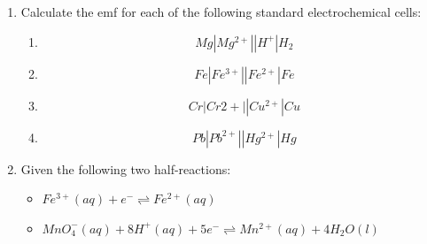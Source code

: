 {\begin{enumerate}
	\begin{enumerate}
	\item{Write down the standard conditions which apply to this electrochemical cell.}
	\item{Identify the metal M. Show calculations.}
	\item Use the standard electrode potentials to write down equations for the:
		\begin{enumerate}
		\item{cathode half-reaction}
		\item{anode half-reaction}
		\item{overall cell reaction}
		\end{enumerate}
	\item{What is the purpose of the salt bridge?}
	\item{Explain why a KCl solution would not be suitable for use in the salt bridge in this cell.}
	\end{enumerate}

(IEB Paper 2, 2004)

\item Calculate the emf for each of the following standard electrochemical cells:

	\begin{enumerate}

\item 
\begin{equation*}
Mg|Mg^{2+}||H^{+}|H_{2}
\end{equation*}

\item
\begin{equation*}
Fe|Fe^{3+}||Fe^{2+}|Fe
\end{equation*}


\item
\begin{equation*}
Cr|Cr{2+}||Cu^{2+}|Cu
\end{equation*}


\item
\begin{equation*}
Pb|Pb^{2+}||Hg^{2+}|Hg
\end{equation*}

\end{enumerate}

\item Given the following two half-reactions:

	\begin{itemize}
	\item{\rm${Fe^{3+}(aq) + e^{-} \rightleftharpoons Fe^{2+}(aq)}$}
	\item{\rm${MnO_{4}^{-}(aq) + 8H^{+}(aq) + 5e^{-} \rightleftharpoons Mn^{2+}(aq) + 4H_{2}O(l)}$}
	\end{itemize}


\end{enumerate}}
